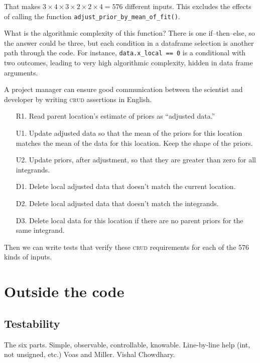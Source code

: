 \documentclass[fleqn,10pt]{olplainarticle}
\begin{document}
\noindent{}That makes $3\times 4 \times 3\times 2\times 2\times 4=576$ different inputs.
This excludes the effects of calling the function
\lstinline!adjust_prior_by_mean_of_fit()!.

What is the algorithmic complexity of this function? There is one
if--then--else, so the answer could be three, but each condition in a dataframe
selection is another path through the code. For instance,
\lstinline!data.x_local == 0! is a conditional with two outcomes, leading
to very high algorithmic complexity, hidden in data frame arguments.

A project manager can ensure good communication between the scientist and
developer by writing \textsc{crud} assertions in English.
\begin{itemize}
    \item[R1.] Read parent location's estimate of priors as ``adjusted data.''
    \item[U1.] Update adjusted data so that the mean of the priors for this location matches
        the mean of the data for this location. Keep the shape of the priors.
    \item[U2.] Update priors, after adjustment, so that they are greater
        than zero for all integrands.
    \item[D1.] Delete local adjusted data that doesn't match the current location.
    \item[D2.] Delete local adjusted data that doesn't match the integrands.
    \item[D3.] Delete local data for this location if there are no parent
        priors for the same integrand.
\end{itemize}
Then we can write tests that verify these \textsc{crud} requirements for
each of the 576 kinds of inputs.





\section{Outside the code}\label{sec:outside-code}

\subsection{Testability}

The six parts. Simple, observable, controllable, knowable. Line-by-line help (int, not unsigned, etc.) Voas and Miller. Vishal Chowdhary.
\end{document}
